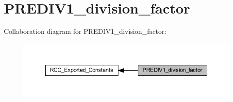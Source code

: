 \hypertarget{group___p_r_e_d_i_v1__division__factor}{}\section{P\+R\+E\+D\+I\+V1\+\_\+division\+\_\+factor}
\label{group___p_r_e_d_i_v1__division__factor}
Collaboration diagram for P\+R\+E\+D\+I\+V1\+\_\+division\+\_\+factor\+:
\nopagebreak
\begin{figure}[H]
\begin{center}
\leavevmode
\includegraphics[width=350pt]{group___p_r_e_d_i_v1__division__factor}
\end{center}
\end{figure}

